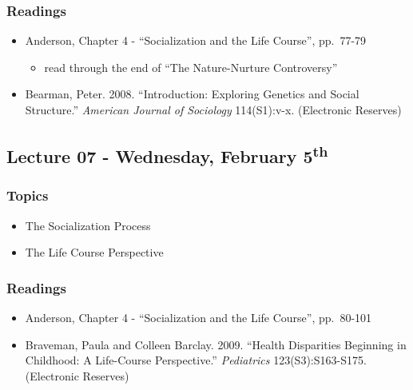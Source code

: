 \documentclass[]{book}
\providecommand{\tightlist}{%
  \setlength{\itemsep}{0pt}\setlength{\parskip}{0pt}}
\begin{document}
\hypertarget{readings-6}{%
\subsubsection*{Readings}\label{readings-6}}

\begin{itemize}
\tightlist
\item
  Anderson, Chapter 4 - ``Socialization and the Life Course'', pp.~77-79

  \begin{itemize}
  \tightlist
  \item
    read through the end of ``The Nature-Nurture Controversy''
  \end{itemize}
\item
  Bearman, Peter. 2008. ``Introduction: Exploring Genetics and Social Structure.'' \emph{American Journal of Sociology} 114(S1):v-x. (Electronic Reserves)
\end{itemize}

\hypertarget{lecture-07---wednesday-february-5th}{%
\subsection*{\texorpdfstring{Lecture 07 - Wednesday, February 5\textsuperscript{th}}{Lecture 07 - Wednesday, February 5th}}\label{lecture-07---wednesday-february-5th}}

\hypertarget{topics-7}{%
\subsubsection*{Topics}\label{topics-7}}

\begin{itemize}
\tightlist
\item
  The Socialization Process
\item
  The Life Course Perspective
\end{itemize}

\hypertarget{readings-7}{%
\subsubsection*{Readings}\label{readings-7}}

\begin{itemize}
\tightlist
\item
  Anderson, Chapter 4 - ``Socialization and the Life Course'', pp.~80-101
\item
  Braveman, Paula and Colleen Barclay. 2009. ``Health Disparities Beginning in Childhood: A Life-Course Perspective.'' \emph{Pediatrics} 123(S3):S163-S175. (Electronic Reserves)
\end{itemize}
\end{document}

